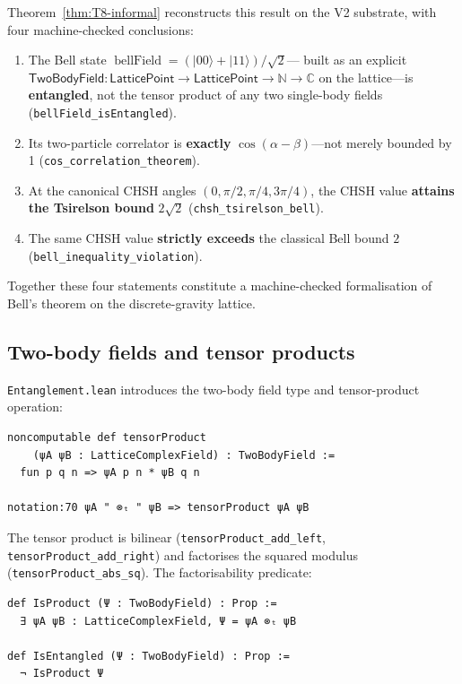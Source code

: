 \documentclass[11pt,a4paper,twoside]{article}
\theoremstyle{definition}
\newcommand{\Cbb}{\mathbb{C}}
\newcommand{\Nbb}{\mathbb{N}}
\newcommand{\code}[1]{\texttt{#1}}
\newcommand{\BellField}{\operatorname{bellField}}
\begin{document}
Theorem~\ref{thm:T8-informal} reconstructs this result on the V2
substrate, with four machine-checked conclusions:
\begin{enumerate}
\item The Bell state $\BellField=(|00\rangle+|11\rangle)/\sqrt{2}$---
  built as an explicit
  $\mathsf{TwoBodyField}:\mathsf{LatticePoint}\to\mathsf{LatticePoint}\to\Nbb\to\Cbb$
  on the lattice---is \textbf{entangled}, not the tensor product of
  any two single-body fields (\code{bellField\_isEntangled}).
\item Its two-particle correlator is \textbf{exactly}
  $\cos(\alpha-\beta)$---not merely bounded by 1
  (\code{cos\_correlation\_theorem}).
\item At the canonical CHSH angles $(0,\pi/2,\pi/4,3\pi/4)$, the CHSH
  value \textbf{attains the Tsirelson bound} $2\sqrt{2}$
  (\code{chsh\_tsirelson\_bell}).
\item The same CHSH value \textbf{strictly exceeds} the classical
  Bell bound $2$ (\code{bell\_inequality\_violation}).
\end{enumerate}

Together these four statements constitute a machine-checked
formalisation of Bell's theorem on the discrete-gravity lattice.

\subsection{Two-body fields and tensor
products}\label{sec:entanglement-2body}

\code{Entanglement.lean} introduces the two-body field type and
tensor-product operation:
\begin{lstlisting}
noncomputable def tensorProduct
    (ψA ψB : LatticeComplexField) : TwoBodyField :=
  fun p q n => ψA p n * ψB q n

notation:70 ψA " ⊗ₜ " ψB => tensorProduct ψA ψB
\end{lstlisting}

The tensor product is bilinear (\code{tensorProduct\_add\_left},
\code{tensorProduct\_add\_right}) and factorises the squared modulus
(\code{tensorProduct\_abs\_sq}). The factorisability predicate:
\begin{lstlisting}
def IsProduct (Ψ : TwoBodyField) : Prop :=
  ∃ ψA ψB : LatticeComplexField, Ψ = ψA ⊗ₜ ψB

def IsEntangled (Ψ : TwoBodyField) : Prop :=
  ¬ IsProduct Ψ
\end{lstlisting}
\end{document}
